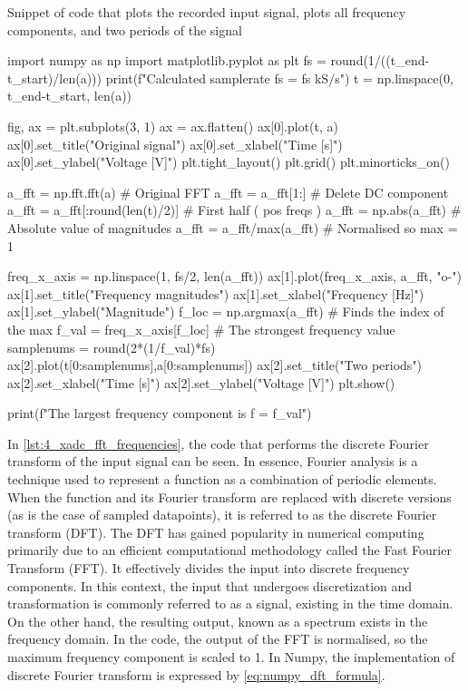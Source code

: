 \begin{listing}[htbp]
	\centering
	\caption{Snippet of code that plots the recorded input signal, plots all frequency components, and two periods of the signal}
	\label{lst:4_xadc_fft_frequencies}
	\begin{mintedpython}
import numpy as np
import matplotlib.pyplot as plt
fs = round(1/((t_end-t_start)/len(a)))
print(f"Calculated samplerate fs = {fs} kS/s")
t = np.linspace(0, t_end-t_start, len(a))

fig, ax = plt.subplots(3, 1)
ax = ax.flatten()
ax[0].plot(t, a)
ax[0].set_title("Original signal")
ax[0].set_xlabel("Time [s]")
ax[0].set_ylabel("Voltage [V]")
plt.tight_layout()
plt.grid()
plt.minorticks_on()

a_fft = np.fft.fft(a)           # Original FFT
a_fft = a_fft[1:]                 # Delete DC component
a_fft = a_fft[:round(len(t)/2)] # First half ( pos freqs )
a_fft = np.abs(a_fft)           # Absolute value of magnitudes
a_fft = a_fft/max(a_fft)        # Normalised so max = 1

freq_x_axis = np.linspace(1, fs/2, len(a_fft))
ax[1].plot(freq_x_axis, a_fft, "o-")
ax[1].set_title("Frequency magnitudes")
ax[1].set_xlabel("Frequency [Hz]")
ax[1].set_ylabel("Magnitude")
f_loc = np.argmax(a_fft) # Finds the index of the max
f_val = freq_x_axis[f_loc] # The strongest frequency value
samplenums = round(2*(1/f_val)*fs)
ax[2].plot(t[0:samplenums],a[0:samplenums])
ax[2].set_title("Two periods")
ax[2].set_xlabel("Time [s]")
ax[2].set_ylabel("Voltage [V]")
plt.show()

print(f"The largest frequency component is f = {f_val}")
	\end{mintedpython}
\end{listing}
In \cref{lst:4_xadc_fft_frequencies}, the code that performs the discrete Fourier transform of the input signal can be seen. In essence, Fourier analysis is a technique used to represent a function as a combination of periodic elements. When the function and its Fourier transform are replaced with discrete versions (as is the case of sampled datapoints), it is referred to as the discrete Fourier transform (DFT). The DFT has gained popularity in numerical computing primarily due to an efficient computational methodology called the Fast Fourier Transform (FFT).  It effectively divides the input into discrete frequency components. In this context, the input that undergoes discretization and transformation is commonly referred to as a signal, existing in the time domain. On the other hand, the resulting output, known as a spectrum exists in the frequency domain. In the code, the output of the FFT is normalised, so the maximum frequency component is scaled to 1. In Numpy, the implementation of discrete Fourier transform is expressed by \cref{eq:numpy_dft_formula}.
